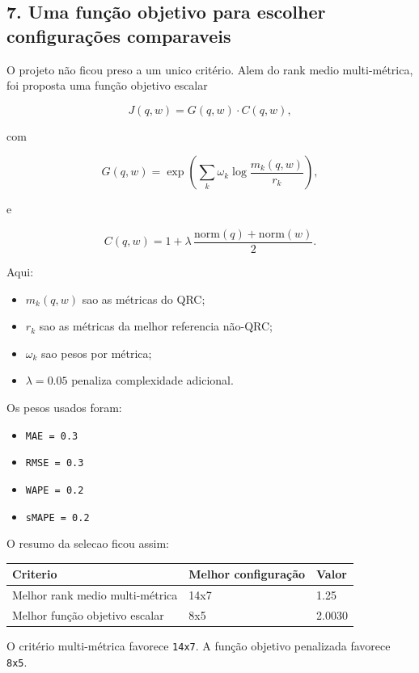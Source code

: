 \documentclass[12pt]{article}
\providecommand{\tightlist}{%
          \setlength{\itemsep}{0pt}\setlength{\parskip}{0pt}}
\begin{document}
\subsection{7. Uma função objetivo para escolher configurações comparaveis}\label{7-uma-funuxe7uxe3o-objetivo-para-escolher-configurauxe7uxf5es-comparaveis}

O projeto não ficou preso a um unico critério. Alem do rank medio multi-métrica, foi proposta uma função objetivo escalar

\[
J(q, w) = G(q, w) \cdot C(q, w),
\]

com

\[
G(q, w) = \exp\left(\sum_k \omega_k \log\frac{m_k(q, w)}{r_k}\right),
\]

e

\[
C(q, w) = 1 + \lambda \, \frac{\mathrm{norm}(q) + \mathrm{norm}(w)}{2}.
\]

Aqui:

\begin{itemize}
\tightlist
\item
  \(m_k(q, w)\) sao as métricas do QRC;
\item
  \(r_k\) sao as métricas da melhor referencia não-QRC;
\item
  \(\omega_k\) sao pesos por métrica;
\item
  \(\lambda = 0.05\) penaliza complexidade adicional.
\end{itemize}

Os pesos usados foram:

\begin{itemize}
\tightlist
\item
  \texttt{MAE\ =\ 0.3}
\item
  \texttt{RMSE\ =\ 0.3}
\item
  \texttt{WAPE\ =\ 0.2}
\item
  \texttt{sMAPE\ =\ 0.2}
\end{itemize}

O resumo da selecao ficou assim:

\begin{longtable}[]{@{}lll@{}}
\toprule\noalign{}
Criterio & Melhor configuração & Valor \\
\midrule\noalign{}
\endhead
\bottomrule\noalign{}
\endlastfoot
Melhor rank medio multi-métrica & 14x7 & 1.25 \\
Melhor função objetivo escalar & 8x5 & 2.0030 \\
\end{longtable}

O critério multi-métrica favorece \texttt{14x7}. A função objetivo penalizada favorece \texttt{8x5}.
\end{document}

